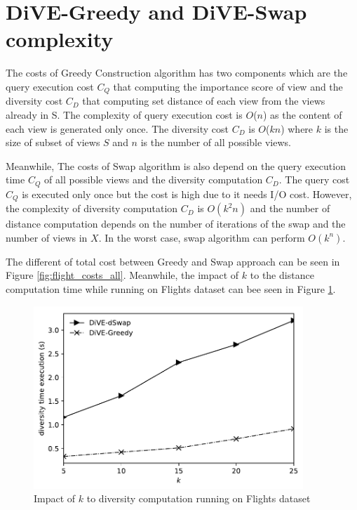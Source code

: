 \documentclass{article}
\begin{document}
\section{DiVE-Greedy and DiVE-Swap complexity}
The costs of Greedy Construction algorithm has two components which are the query execution cost $C_Q$ that computing the importance score of view and the diversity cost $C_D$ that computing set distance of each view from the views already in S. The complexity of query execution cost is $ O$($n$) as the content of each view is generated only once. The diversity cost $C_D$ is $ O$($kn$) where $k$ is the size of subset of views $ S $ and $ n $ is the number of all possible views.


Meanwhile, The costs of Swap algorithm is also depend on the query execution time $C_Q$ of all possible views and the diversity computation $C_D$. The query cost $C_Q$ is executed only once but the cost is high due to it needs I/O cost. However, the complexity of diversity computation $C_D$ is $ O\left(k^2n \right) $ and the number of distance computation depends on the number of iterations of the swap and the number of views in $X$. In the worst case, swap algorithm can perform $ O\left(k^n \right) $. 

The different of total cost between Greedy and Swap approach can be seen in Figure \ref{fig:flight_costs_all}. Meanwhile, the impact of $k$ to the distance computation time while running on Flights dataset can bee seen in Figure \ref{fig:impact-of-k-diversity-computation}.

\begin{figure}
	\begin{center}
		\includegraphics[width=4.0in]{figures/impact_of_k_to_diversity_cost}
		\vspace{-12pt}
		\caption{Impact of $k$ to diversity computation running on Flights dataset}
		\label{fig:impact-of-k-diversity-computation}
		
	\end{center}
\end{figure}
\end{document}

